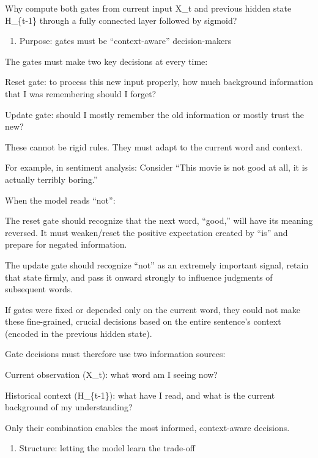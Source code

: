 Why compute both gates from current input X\_t and previous hidden state H\_\{t-1\} through a fully connected layer followed by sigmoid?

\begin{enumerate}
\def\labelenumi{\arabic{enumi}.}
\tightlist
\item
  Purpose: gates must be ``context-aware'' decision-makers
\end{enumerate}

The gates must make two key decisions at every time:

Reset gate: to process this new input properly, how much background information that I was remembering should I forget?

Update gate: should I mostly remember the old information or mostly trust the new?

These cannot be rigid rules. They must adapt to the current word and context.

For example, in sentiment analysis:
Consider ``This movie is not good at all, it is actually terribly boring.''

When the model reads ``not'':

The reset gate should recognize that the next word, ``good,'' will have its meaning reversed. It must weaken/reset the positive expectation created by ``is'' and prepare for negated information.

The update gate should recognize ``not'' as an extremely important signal, retain that state firmly, and pass it onward strongly to influence judgments of subsequent words.

If gates were fixed or depended only on the current word, they could not make these fine-grained, crucial decisions based on the entire sentence's context (encoded in the previous hidden state).

Gate decisions must therefore use two information sources:

Current observation (X\_t): what word am I seeing now?

Historical context (H\_\{t-1\}): what have I read, and what is the current background of my understanding?

Only their combination enables the most informed, context-aware decisions.

\begin{enumerate}
\def\labelenumi{\arabic{enumi}.}
\setcounter{enumi}{1}
\tightlist
\item
  Structure: letting the model learn the trade-off
\end{enumerate}

